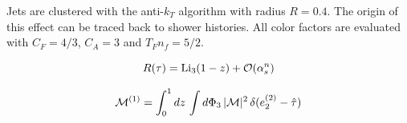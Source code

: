 Jets are clustered with the anti-$k_T$ algorithm with radius $R = 0.4$.
The origin of this effect can be traced back to shower histories. All
color factors are evaluated with $C_F = 4/3$, $C_A = 3$ and $T_F n_f =
5/2$.

\begin{equation}
  R(\tau) = \mathrm{Li}_{3}(1 - z) + \mathcal{O}(\alpha_s^{n})
  \label{eq:3}
\end{equation}

\begin{equation}
  \mathcal{M}^{(1)} = \int_0^1 dz \, \int d\Phi_{3} \, |\mathcal{M}|^2 \, \delta(e_2^{(2)} - \hat{\tau})
  \label{eq:5}
\end{equation}


